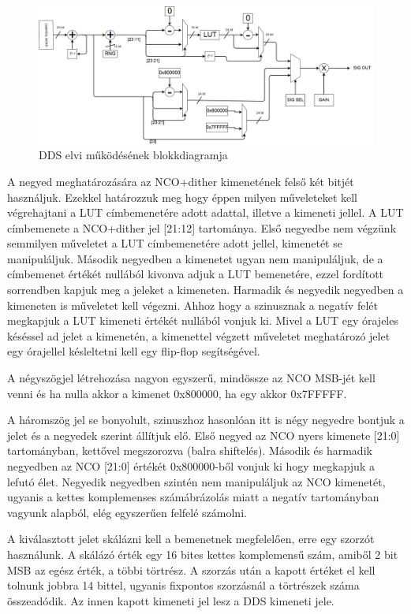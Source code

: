 \documentclass[a4paper,11pt]{article}
\begin{document}
\begin{figure}[h!]
	\begin{center}
		\includegraphics[scale=0.36]{DDS_block.jpg}	
	\end{center}
	\caption{DDS elvi működésének blokkdiagramja}
	\label{a:DDSinternal}
\end{figure}

A negyed meghatározására az NCO+dither kimenetének felső két bitjét használjuk. Ezekkel határozzuk meg hogy éppen milyen műveleteket kell végrehajtani a LUT címbemenetére adott adattal, illetve a kimeneti jellel. A LUT címbemenete a NCO+dither jel [21:12] tartománya. Első negyedbe nem végzünk semmilyen műveletet a LUT címbemenetére adott jellel, kimenetét se manipuláljuk. Második negyedben a kimenetet ugyan nem manipuláljuk, de a címbemenet értékét nullából kivonva adjuk a LUT bemenetére, ezzel fordított sorrendben kapjuk meg a jeleket a kimeneten. Harmadik és negyedik negyedben a kimeneten is műveletet kell végezni. Ahhoz hogy a szinusznak a negatív felét megkapjuk a LUT kimeneti értékét nullából vonjuk ki. Mivel a LUT egy órajeles késéssel ad jelet a kimenetén, a kimenettel végzett műveletet meghatározó jelet egy órajellel késleltetni kell egy flip-flop segítségével.

A négyszögjel létrehozása nagyon egyszerű, mindössze az NCO MSB-jét kell venni és ha nulla akkor a kimenet 0x800000, ha egy akkor 0x7FFFFF.

A háromszög jel se bonyolult, szinuszhoz hasonlóan itt is négy negyedre bontjuk a jelet és a negyedek szerint állítjuk elő. Első negyed az NCO nyers kimenete [21:0] tartományban, kettővel megszorozva (balra shiftelés). Második és harmadik negyedben az NCO [21:0] értékét 0x800000-ből vonjuk ki hogy megkapjuk a lefutó élet. Negyedik negyedben szintén nem manipuláljuk az NCO kimenetét, ugyanis a kettes komplemenses számábrázolás miatt a negatív tartományban vagyunk alapból, elég egyszerűen felfelé számolni.

A kiválasztott jelet skálázni kell a bemenetnek megfelelően, erre egy szorzót használunk. A skálázó érték egy 16 bites kettes komplemensű szám, amiből 2 bit MSB az egész érték, a többi törtrész. A szorzás után a kapott értéket el kell tolnunk jobbra 14 bittel, ugyanis fixpontos szorzásnál a törtrészek száma összeadódik. Az innen kapott kimeneti jel lesz a DDS kimeneti jele.
\end{document}
